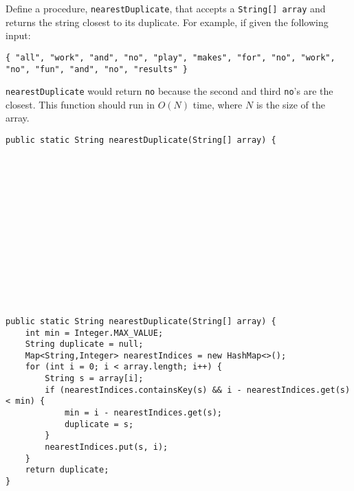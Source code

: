 \question Define a procedure, \texttt{nearestDuplicate}, that accepts a \texttt{String[] array} and returns the string closest to its duplicate. For example, if given the following input:

\begin{verbatim}
{ "all", "work", "and", "no", "play", "makes", "for", "no", "work", "no", "fun", "and", "no", "results" }
\end{verbatim}

\texttt{nearestDuplicate} would return \texttt{no} because the second and third \texttt{no}'s are the closest. This function should run in $O(N)$ time, where $N$ is the size of the array.

\ifprintanswers
\else
\begin{lstlisting}
public static String nearestDuplicate(String[] array) {















\end{lstlisting}
\fi

\begin{solution}
\begin{lstlisting}
public static String nearestDuplicate(String[] array) {
    int min = Integer.MAX_VALUE;
    String duplicate = null;
    Map<String,Integer> nearestIndices = new HashMap<>();
    for (int i = 0; i < array.length; i++) {
        String s = array[i];
        if (nearestIndices.containsKey(s) && i - nearestIndices.get(s) < min) {
            min = i - nearestIndices.get(s);
            duplicate = s;
        }
        nearestIndices.put(s, i);
    }
    return duplicate;
}
\end{lstlisting}
\end{solution}